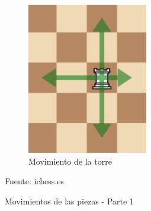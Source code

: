 \documentclass[conference]{IEEEtran}
\begin{document}
\begin{figure}[h!]
\begin{subfigure}[b]{0.455\linewidth}
    \includegraphics[width=\linewidth]{images/Capturep02.PNG}
    \caption{Movimiento de la torre}
    \label{fig:torreM}
    \end{subfigure}
    \caption{Movimientos de las piezas - Parte 1}
    {{\footnotesize Fuente: ichess.es}}
    \label{fig:westminster}
    \end{figure}
    
\end{document}
